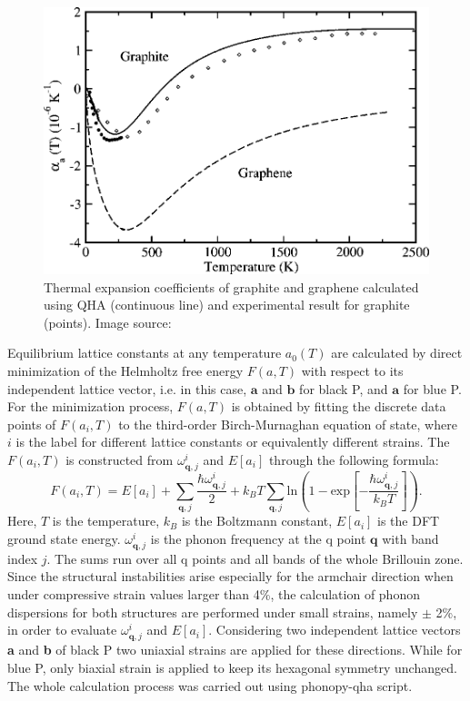 \begin{figure}[htbp!] 
\centering
\includegraphics[width=0.8\linewidth]{qha_gra.png}%
\caption{ Thermal expansion coefficients of graphite and graphene calculated using QHA (continuous line) and experimental result for graphite (points). Image source: \cite{QHA1} }
\label{fig:qha_gra}
\end{figure}

Equilibrium lattice constants at any temperature $a_0(T)$ are calculated by direct minimization of the Helmholtz free energy $F(a,T)$ with respect to its independent lattice vector, i.e. in this case, $\mathbf{a}$ and $\mathbf{b}$ for black P, and $\mathbf{a}$ for blue P. For the minimization process, $F(a,T)$ is obtained by fitting the discrete data points of $F({a_i,T})$ to the third-order Birch-Murnaghan equation of state, where $i$ is the label for different lattice constants or equivalently different strains. The $F({a_i,T})$ is constructed from $\omega^i_{\mathbf{q},j}$ and $E[a_i]$ through the following formula\cite{QHA0,QHA1}:
\begin{equation}\label{eq:free-enerji}
F({a_i,T}) = E[a_i]+\sum_{\mathbf{q},j}\frac{\hbar \omega^i_{\mathbf{q},j}}{2} +k_BT\sum_{\mathbf{q},j}\text{ln}\left( 1-\text{exp} \left[ -\frac{\hbar \omega^i_{\mathbf{q},j}}{k_BT} \right]\right).
\end{equation}
Here, $T$ is the temperature, $k_B$ is the Boltzmann constant, $E[a_i]$ is the DFT ground state energy. $\omega^i_{\mathbf{q},j}$ is the phonon frequency at the q point $\mathbf{q}$ with band index $j$. 
The sums  run over all q points and all bands of the whole Brillouin zone. Since the structural instabilities arise especially for the armchair direction when under compressive strain values larger than 4\%,  the calculation of phonon dispersions for both structures are performed under small strains, namely $\pm$ 2\%,  in order to evaluate $\omega^i_{\mathbf{q},j}$ and $E[a_i]$. Considering two independent lattice vectors \textbf{a} and \textbf{b} of black P two uniaxial strains are applied for these directions. While for blue P, only biaxial strain is applied to keep its hexagonal symmetry unchanged. The whole calculation process was carried out using phonopy-qha script\cite{phonopy-qha}.


